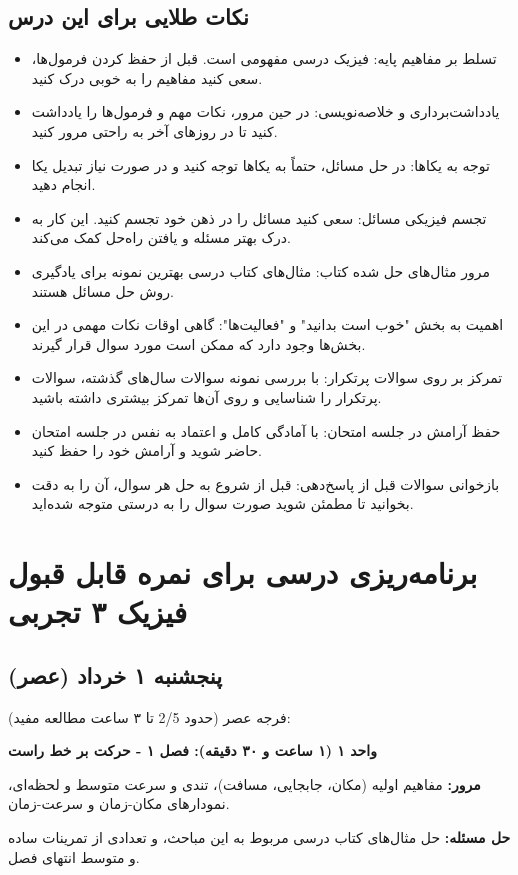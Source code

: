\documentclass[12pt]{article}
\newcommand{\unithead}[1]{\par\vspace{1ex}\noindent\textbf{#1}\par\nopagebreak[4]\vspace{0.5ex}}
\newcommand{\休息}[1]{\par\centering\textit{#1}\par\vspace{1ex}} %
\begin{document}
\subsection*{نکات طلایی برای این درس}
\begin{itemize}
    \item تسلط بر مفاهیم پایه: فیزیک درسی مفهومی است. قبل از حفظ کردن فرمول‌ها، سعی کنید مفاهیم را به خوبی درک کنید.
    \item یادداشت‌برداری و خلاصه‌نویسی: در حین مرور، نکات مهم و فرمول‌ها را یادداشت کنید تا در روزهای آخر به راحتی مرور کنید.
    \item توجه به یکاها: در حل مسائل، حتماً به یکاها توجه کنید و در صورت نیاز تبدیل یکا انجام دهید.
    \item تجسم فیزیکی مسائل: سعی کنید مسائل را در ذهن خود تجسم کنید. این کار به درک بهتر مسئله و یافتن راه‌حل کمک می‌کند.
    \item مرور مثال‌های حل شده کتاب: مثال‌های کتاب درسی بهترین نمونه برای یادگیری روش حل مسائل هستند.
    \item اهمیت به بخش "خوب است بدانید" و "فعالیت‌ها": گاهی اوقات نکات مهمی در این بخش‌ها وجود دارد که ممکن است مورد سوال قرار گیرند.
    \item تمرکز بر روی سوالات پرتکرار: با بررسی نمونه سوالات سال‌های گذشته، سوالات پرتکرار را شناسایی و روی آن‌ها تمرکز بیشتری داشته باشید.
    \item حفظ آرامش در جلسه امتحان: با آمادگی کامل و اعتماد به نفس در جلسه امتحان حاضر شوید و آرامش خود را حفظ کنید.
    \item بازخوانی سوالات قبل از پاسخ‌دهی: قبل از شروع به حل هر سوال، آن را به دقت بخوانید تا مطمئن شوید صورت سوال را به درستی متوجه شده‌اید.
\end{itemize}

\newpage
\section*{برنامه‌ریزی درسی برای نمره قابل قبول فیزیک ۳ تجربی}

\subsection*{پنجشنبه ۱ خرداد (عصر)}
فرجه عصر (حدود 2/5 تا ۳ ساعت مطالعه مفید):

\unithead{واحد ۱ (۱ ساعت و ۳۰ دقیقه): فصل ۱ - حرکت بر خط راست}
\noindent\textbf{مرور: }مفاهیم اولیه (مکان، جابجایی، مسافت)، تندی و سرعت متوسط و لحظه‌ای، نمودارهای مکان-زمان و سرعت-زمان.
\par\noindent\textbf{حل مسئله: }حل مثال‌های کتاب درسی مربوط به این مباحث، و تعدادی از تمرینات ساده و متوسط انتهای فصل.
\end{document}
